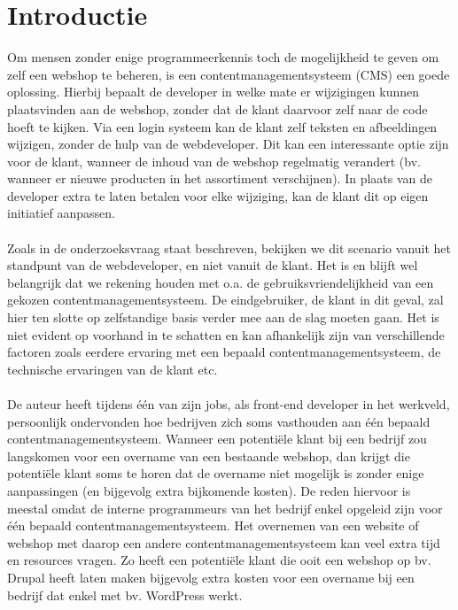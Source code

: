 
\section{Introductie}%
\label{sec:introductie}

Om mensen zonder enige programmeerkennis toch de mogelijkheid te geven om zelf een webshop te beheren, is een contentmanagementsysteem (CMS) een goede oplossing. Hierbij bepaalt de developer in welke mate er wijzigingen kunnen plaatsvinden aan de webshop, zonder dat de klant daarvoor zelf naar de code hoeft te kijken. Via een login systeem kan de klant zelf teksten en afbeeldingen wijzigen, zonder de hulp van de webdeveloper. Dit kan een interessante optie zijn voor de klant, wanneer de inhoud van de webshop regelmatig verandert (bv. wanneer er nieuwe producten in het assortiment verschijnen). In plaats van de developer extra te laten betalen voor elke wijziging, kan de klant dit op eigen initiatief aanpassen.
\\\\
Zoals in de onderzoeksvraag staat beschreven, bekijken we dit scenario vanuit het standpunt van de webdeveloper, en niet vanuit de klant. Het is en blijft wel belangrijk dat we rekening houden met o.a. de gebruiksvriendelijkheid van een gekozen contentmanagementsysteem. De eindgebruiker, de klant in dit geval, zal hier ten slotte op zelfstandige basis verder mee aan de slag moeten gaan. Het is niet evident op voorhand in te schatten en kan afhankelijk zijn van verschillende factoren zoals eerdere ervaring met een bepaald contentmanagementsysteem, de technische ervaringen van de klant etc. 
\\\\
De auteur heeft tijdens één van zijn jobs, als front-end developer in het werkveld, persoonlijk ondervonden hoe bedrijven zich soms vasthouden aan één bepaald contentmanagementsysteem. Wanneer een potentiële klant bij een bedrijf zou langskomen voor een overname van een bestaande webshop, dan krijgt die potentiële klant soms te horen dat de overname niet mogelijk is zonder enige aanpassingen (en bijgevolg extra bijkomende kosten). De reden hiervoor is meestal omdat de interne programmeurs van het bedrijf enkel opgeleid zijn voor één bepaald contentmanagementsysteem. Het overnemen van een website of webshop met daarop een andere contentmanagementsysteem kan veel extra tijd en resources vragen. Zo heeft een potentiële klant die ooit een webshop op bv. Drupal heeft laten maken bijgevolg extra kosten voor een overname bij een bedrijf dat enkel met bv. WordPress werkt. 
